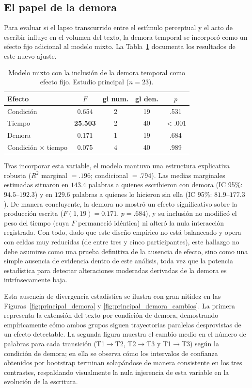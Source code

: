 \documentclass[12pt]{article}
\begin{document}
	\subsection{El papel de la demora}
	
	Para evaluar si el lapso transcurrido entre el estímulo perceptual y el acto de escribir influye en el volumen del texto, la demora temporal se incorporó como un efecto fijo adicional al modelo mixto. La Tabla~\ref{tab:demora} documenta los resultados de este nuevo ajuste.
	
	\begin{table}[htbp]
		\centering
		\caption{Modelo mixto con la inclusión de la demora temporal como efecto fijo. Estudio principal ($n = 23$).}
		\label{tab:demora}
		\begin{tabular}{l c c c c}
			\toprule
			Efecto & $F$ & gl num. & gl den. & $p$ \\
			\midrule
			Condición                & 0.654 & 2 & 19 & .531 \\
			Tiempo                   & \textbf{25.503} & 2 & 40 & \textbf{$< .001$} \\
			Demora                   & 0.171 & 1 & 19 & .684 \\
			Condición $\times$ tiempo & 0.075 & 4 & 40 & .989 \\
			\bottomrule
		\end{tabular}
	\end{table}
	
	Tras incorporar esta variable, el modelo mantuvo una estructura explicativa robusta ($R^2$ marginal $= .196$; condicional $= .794$). Las medias marginales estimadas situaron en $143.4$ palabras a quienes escribieron con demora (IC 95\%: $94.5$--$192.3$) y en $129.6$ palabras a quienes lo hicieron sin ella (IC 95\%: $81.9$--$177.3$). De manera concluyente, la demora no mostró un efecto significativo sobre la producción escrita ($F(1,19) = 0.171$, $p = .684$), y su inclusión no modificó el peso del tiempo (cuya $F$ permaneció idéntica) ni alteró la nula interacción registrada. Con todo, dado que este diseño empírico no está balanceado y opera con celdas muy reducidas (de entre tres y cinco participantes), este hallazgo no debe asumirse como una prueba definitiva de la ausencia de efecto, sino como una simple ausencia de evidencia dentro de este análisis, toda vez que la potencia estadística para detectar alteraciones moderadas derivadas de la demora es intrínsecamente baja.
	
	Esta ausencia de divergencia estadística se ilustra con gran nitidez en las Figuras~\ref{fig:principal_demora} y \ref{fig:principal_demora_cambios}. La primera representa la extensión del texto por condición de demora, demostrando empíricamente cómo ambos grupos siguen trayectorias paralelas desprovistas de un efecto detectable. La segunda figura muestra el cambio medio en el número de palabras para cada transición (T1$\to$T2, T2$\to$T3 y T1$\to$T3) según la condición de demora; en ella se observa cómo los intervalos de confianza obtenidos por bootstrap terminan solapándose de manera consistente en los tres contrastes, respaldando visualmente la nula injerencia de esta variable en la evolución de la escritura.
	
\end{document}
